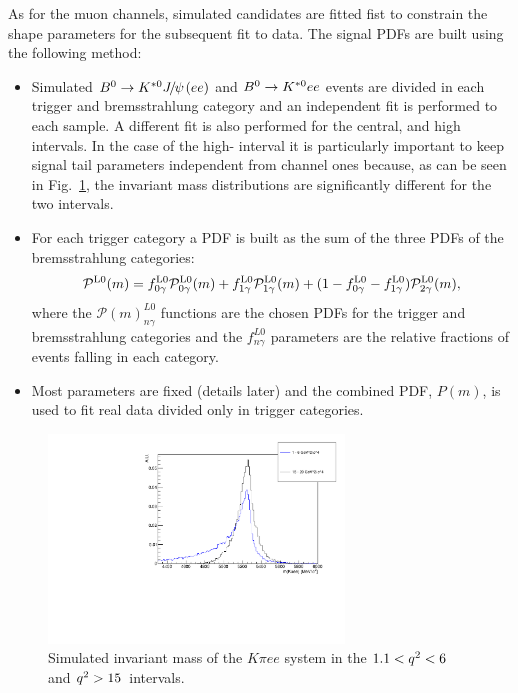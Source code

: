 As for the muon channels, simulated candidates are fitted fist to constrain
the shape parameters for the subsequent fit to data. The signal PDFs are built using the following method:
%
\begin{itemize}
\item Simulated $\Bz\to\Kstarz\jpsi(ee)$ and ${{B}^0}\rightarrow{\ensuremath{{K}^{*0}}} ee$ events are divided
in each trigger and bremsstrahlung category and an independent fit is performed to each sample.
A different fit is also performed for the central, \jpsi and high \qsq intervals. In the case of the high-\qsq 
interval it is particularly important to keep signal tail parameters independent from \jpsi channel ones
because, as can be seen in Fig.~\ref{fig:high_central_mass_comparison}, the invariant mass
distributions are significantly different for the two intervals.
\item For each trigger category a PDF is built as the sum of the three PDFs of the bremsstrahlung categories:
\begin{equation}
\mathcal{P}^{\rm L0}(m) = f^{\rm L0}_{0\gamma} \mathcal{P}^{\rm L0}_{0\gamma}(m) + f^{\rm L0}_{1\gamma} \mathcal{P}^{\rm L0}_{1\gamma}(m) + (1 - f^{\rm L0}_{0\gamma} - f^{\rm L0}_{1\gamma}) \mathcal{P}^{\rm L0}_{2\gamma}(m),
\end{equation}
where the $\mathcal{P}(m)^{L0}_{n\gamma}$ functions are the chosen PDFs for the trigger and bremsstrahlung categories
and the $f^{L0}_{n\gamma}$ parameters are the relative fractions of events falling in each category.
\item Most parameters are fixed (details later) and the combined PDF, $P(m)$,
is used to fit real data divided only in trigger categories.
\end{itemize}
%
\begin{figure}[h!]
\centering
\includegraphics[width=0.70\textwidth]{RKst/figs/high_central_mass_comparison.pdf}
\caption{Simulated invariant mass of the $K\pi ee$ system in the $1.1 < {q^2} < 6$ and ${q^2} > 15$~\gevgevcccc intervals.  }
\label{fig:high_central_mass_comparison}
\end{figure}

